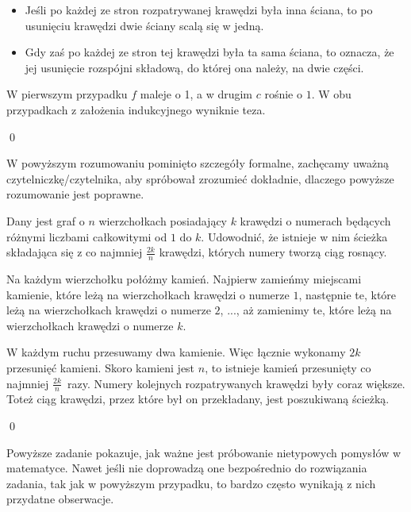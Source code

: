 \begin{itemize}
	\item Jeśli po każdej ze stron rozpatrywanej krawędzi była inna ściana, to po usunięciu krawędzi dwie ściany scalą się w jedną.
	\item Gdy zaś po każdej ze stron tej krawędzi była ta sama ściana, to oznacza, że jej usunięcie rozspójni składową, do której ona należy, na dwie części.
\end{itemize}

\noindent
W pierwszym przypadku $f$ maleje o 1, a w drugim $c$ rośnie o $1$. W obu przypadkach z założenia indukcyjnego wyniknie teza.

\qed

\noindent
W powyższym rozumowaniu pominięto szczegóły formalne, zachęcamy uważną czytelniczkę/czytelnika, aby spróbował zrozumieć dokładnie, dlaczego powyższe rozumowanie jest poprawne.

\vspace{5px}




\noindent
Dany jest graf o $n$ wierzchołkach posiadający $k$ krawędzi o numerach
będących różnymi liczbami całkowitymi od $1$ do $k$. Udowodnić, że istnieje w
nim ścieżka składająca się z co najmniej $\frac{2k}{n}$ krawędzi, których numery tworzą ciąg rosnący.

\vspace{5px}


\vspace{5px}
\noindent
Na każdym wierzchołku połóżmy kamień. Najpierw zamieńmy miejscami kamienie, które leżą na wierzchołkach krawędzi o numerze $1$, następnie te, które leżą na wierzchołkach krawędzi o numerze $2$, ..., aż zamienimy te, które leżą na wierzchołkach krawędzi o numerze $k$.

\vspace{10px}
\noindent
W każdym ruchu przesuwamy dwa kamienie. Więc łącznie wykonamy $2k$ przesunięć kamieni. Skoro kamieni jest $n$, to istnieje kamień przesunięty co najmniej $\frac{2k}{n}$~razy. Numery kolejnych rozpatrywanych krawędzi były coraz większe. Toteż ciąg krawędzi, przez które był on przekładany, jest poszukiwaną ścieżką. 

\qed

\noindent
Powyższe zadanie pokazuje, jak ważne jest próbowanie nietypowych pomysłów w matematyce. Nawet jeśli nie doprowadzą one bezpośrednio do rozwiązania zadania, tak jak w powyższym przypadku, to bardzo często wynikają z nich przydatne obserwacje.

\newpage